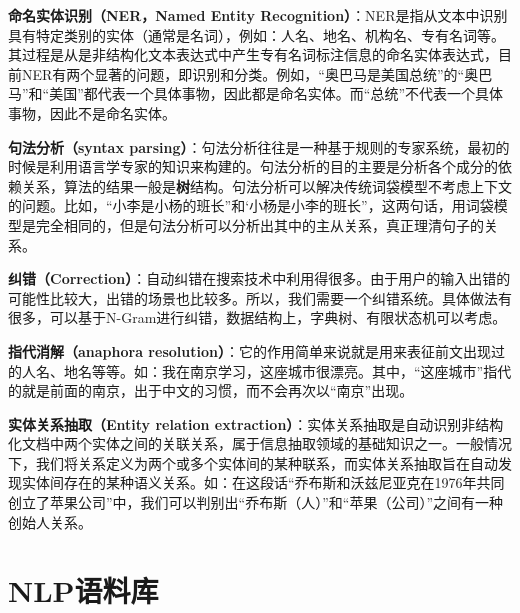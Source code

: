 \documentclass[UTF8]{ctexart}
\begin{document}
\begin{enumerate}
\begin{item}
	\textbf{命名实体识别（NER，Named Entity Recognition）}：NER是指从文本中识别具有特定类别的实体（通常是名词），例如：人名、地名、机构名、专有名词等。其过程是从是非结构化文本表达式中产生专有名词标注信息的命名实体表达式，目前NER有两个显著的问题，即识别和分类。例如，“奥巴马是美国总统”的“奥巴马”和“美国”都代表一个具体事物，因此都是命名实体。而“总统”不代表一个具体事物，因此不是命名实体。
\end{item}
\begin{item}
	\textbf{句法分析（syntax parsing）}：句法分析往往是一种基于规则的专家系统，最初的时候是利用语言学专家的知识来构建的。句法分析的目的主要是分析各个成分的依赖关系，算法的结果一般是\textbf{树}结构。句法分析可以解决传统词袋模型不考虑上下文的问题。比如，“小李是小杨的班长”和‘小杨是小李的班长”，这两句话，用词袋模型是完全相同的，但是句法分析可以分析出其中的主从关系，真正理清句子的关系。
\end{item}
\begin{item}
	\textbf{纠错（Correction）}：自动纠错在搜索技术中利用得很多。由于用户的输入出错的可能性比较大，出错的场景也比较多。所以，我们需要一个纠错系统。具体做法有很多，可以基于N-Gram进行纠错，数据结构上，字典树、有限状态机可以考虑。
\end{item}
\begin{item}
\textbf{指代消解（anaphora resolution）}：它的作用简单来说就是用来表征前文出现过的人名、地名等等。如：我在南京学习，这座城市很漂亮。其中，“这座城市”指代的就是前面的南京，出于中文的习惯，而不会再次以“南京”出现。
\end{item}

\begin{item}
\textbf{实体关系抽取（Entity relation extraction）}：实体关系抽取是自动识别非结构化文档中两个实体之间的关联关系，属于信息抽取领域的基础知识之一。一般情况下，我们将关系定义为两个或多个实体间的某种联系，而实体关系抽取旨在自动发现实体间存在的某种语义关系。如：在这段话“乔布斯和沃兹尼亚克在1976年共同创立了苹果公司”中，我们可以判别出“乔布斯（人）”和“苹果（公司）”之间有一种创始人关系。
\end{item}

\end{enumerate}


\section{NLP语料库}
\end{document}
